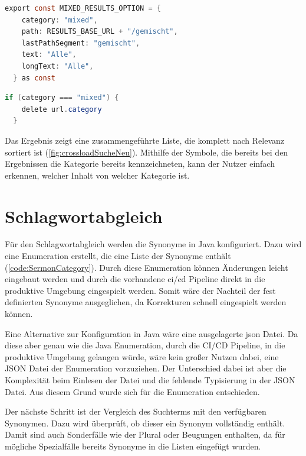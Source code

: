 \begin{lstlisting}[language=Java, title={Erstellen der gemischten Kategorie \cite{frontend2022}}]
  export const MIXED_RESULTS_OPTION = {
    category: "mixed",
    path: RESULTS_BASE_URL + "/gemischt",
    lastPathSegment: "gemischt",
    text: "Alle",
    longText: "Alle",
  } as const
\end{lstlisting}

\begin{lstlisting}[language=Java, title={Löschen der Kategorie aus den API Parametern \cite{frontend2022}}]
  if (category === "mixed") {
    delete url.category
  }
\end{lstlisting}

Das Ergebnis zeigt eine zusammengeführte Liste, die komplett nach Relevanz sortiert ist (\ref{fig:crossloadSucheNeu}).
Mithilfe der Symbole, die bereits bei den Ergebnissen die Kategorie bereits kennzeichneten, kann der Nutzer einfach erkennen, welcher Inhalt von welcher Kategorie ist.

\section{Schlagwortabgleich}
\label{sec:devKeywords}

Für den Schlagwortabgleich werden die Synonyme in Java konfiguriert.
Dazu wird eine Enumeration erstellt, die eine Liste der Synonyme enthält (\ref{code:SermonCategory}).
Durch diese Enumeration können Änderungen leicht eingebaut werden und durch die vorhandene \gls{ci}/\gls{cd} Pipeline direkt in die produktive Umgebung eingespielt werden.
Somit wäre der Nachteil der fest definierten Synonyme ausgeglichen, da Korrekturen schnell eingespielt werden können.

Eine Alternative zur Konfiguration in Java wäre eine ausgelagerte \gls{json} Datei.
Da diese aber genau wie die Java Enumeration, durch die CI/CD Pipeline, in die produktive Umgebung gelangen würde, wäre kein großer Nutzen dabei, eine JSON Datei der Enumeration vorzuziehen.
Der Unterschied dabei ist aber die Komplexität beim Einlesen der Datei und die fehlende Typisierung in der JSON Datei.
Aus diesem Grund wurde sich für die Enumeration entschieden.

Der nächste Schritt ist der Vergleich des Suchterms mit den verfügbaren Synonymen.
Dazu wird überprüft, ob dieser ein Synonym vollständig enthält.
Damit sind auch Sonderfälle wie der Plural oder Beugungen enthalten, da für mögliche Spezialfälle bereits Synonyme in die Listen eingefügt wurden.

